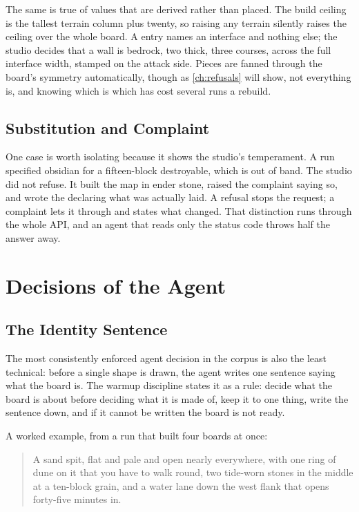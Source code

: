 The same is true of values that are derived rather than placed. The build ceiling
is the tallest terrain column plus twenty, so raising any terrain silently raises
the ceiling over the whole board. A  entry names an interface and
nothing else; the studio decides that a wall is bedrock, two thick, three courses,
across the full interface width, stamped on the attack side. Pieces are fanned
through the board's symmetry automatically, though as \cref{ch:refusals} will show,
not everything is, and knowing which is which has cost several runs a rebuild.

\subsection{Substitution and Complaint}

One case is worth isolating because it shows the studio's temperament. A run
specified obsidian for a fifteen-block destroyable, which is out of band. The
studio did not refuse. It built the map in ender stone, raised the complaint
 saying so, and wrote the  declaring what was actually laid.
A refusal stops the request; a complaint lets it through and states what changed.
That distinction runs through the whole API, and an agent that reads only the
status code throws half the answer away.

\section{Decisions of the Agent}

\subsection{The Identity Sentence}

The most consistently enforced agent decision in the corpus is also the least
technical: before a single shape is drawn, the agent writes one sentence saying
what the board is. The warmup discipline states it as a rule: decide what the
board is about before deciding what it is made of, keep it to one thing, write the
sentence down, and if it cannot be written the board is not ready.

A worked example, from a run that built four boards at once:

\begin{quote}
A sand spit, flat and pale and open nearly everywhere, with one ring of dune on
it that you have to walk round, two tide-worn stones in the middle at a ten-block
grain, and a water lane down the west flank that opens forty-five minutes in.
\end{quote}

